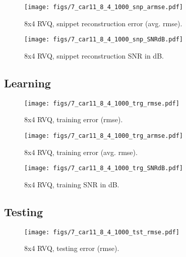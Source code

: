 								\begin{figure}[h!]
								\centering
								\texttt{[image: figs/7\_car11\_8\_4\_1000\_snp\_armse.pdf]}
								\caption{8x4 RVQ, snippet reconstruction error (avg. rmse).}
								\label{fig:7_car11_8_4_1000_snp_armse}
								\end{figure}

								\begin{figure}[h!]
								\centering
								\texttt{[image: figs/7\_car11\_8\_4\_1000\_snp\_SNRdB.pdf]}
								\caption{8x4 RVQ, snippet reconstruction SNR in dB.}
								\label{fig:7_car11_8_4_1000_snp_SNRdB}
								\end{figure}
\clearpage
\newpage
\subsection{Learning}

								\begin{figure}[h!]
								\centering
								\texttt{[image: figs/7\_car11\_8\_4\_1000\_trg\_rmse.pdf]}
								\caption{8x4 RVQ, training error (rmse).}
								\label{fig:7_car11_8_4_1000_trg_rmse}
								\end{figure}


								\begin{figure}[h!]
								\centering
								\texttt{[image: figs/7\_car11\_8\_4\_1000\_trg\_armse.pdf]}
								\caption{8x4 RVQ, training error (avg. rmse).}
								\label{fig:7_car11_8_4_1000_trg_armse}
								\end{figure}

								\begin{figure}[h!]
								\centering
								\texttt{[image: figs/7\_car11\_8\_4\_1000\_trg\_SNRdB.pdf]}
								\caption{8x4 RVQ, training SNR in dB.}
								\label{fig:7_car11_8_4_1000_trg_SNRdB}
								\end{figure}
\clearpage
\newpage
\subsection{Testing}
								\begin{figure}[h!]
								\centering
								\texttt{[image: figs/7\_car11\_8\_4\_1000\_tst\_rmse.pdf]}
								\caption{8x4 RVQ, testing error (rmse).}
								\label{fig:7_car11_8_4_1000_tst_rmse}
								\end{figure}


